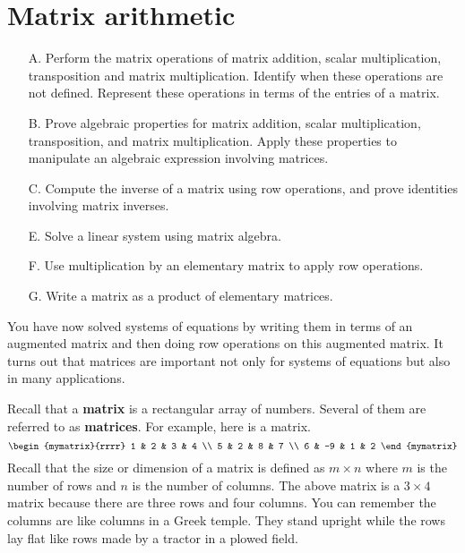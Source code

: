 \section{Matrix arithmetic}

\begin{outcome}
\begin{enumerate}
\item[A.] Perform the matrix operations of matrix addition, scalar
multiplication, transposition and matrix multiplication. Identify when
these operations are not defined. Represent these operations in terms
of the entries of a matrix.

\item[B.] Prove algebraic properties for matrix addition, scalar
multiplication, transposition, and matrix multiplication. Apply these
properties to manipulate an algebraic expression involving matrices.

\item[C.] Compute the inverse of a matrix using row operations, and prove identities involving
matrix inverses.

\item[E.] Solve a linear system using matrix algebra.

\item[F.] Use multiplication by an elementary matrix to apply row operations. 

\item[G.] Write a matrix as a product of elementary matrices.

\end{enumerate}
\end{outcome}

You have now solved systems of equations by writing them in terms of an
augmented matrix and then doing row operations on this augmented matrix. It
turns out that matrices are important not only for systems of equations but also in many applications.

Recall that a \textbf{matrix} is a rectangular array of numbers. Several of them are
referred to as \textbf{matrices}. For example, here is a matrix.
\begin{equation}
\begin{mymatrix}{rrrr}
1 & 2 & 3 & 4 \\
5 & 2 & 8 & 7 \\
6 & -9 & 1 & 2
\end{mymatrix}
\label{matrix}
\end{equation}
Recall that the size or dimension of a matrix is defined as $m\times n$ where $m$ is the
number of rows and $n$ is the number of columns. The above matrix is a 
$3\times 4$ matrix because there are three rows and four columns.  You can remember the columns are
like columns in a Greek temple. They stand upright while the rows lay
flat like rows made by a tractor in a plowed field.

